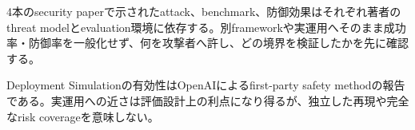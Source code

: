 \begin{claimboundary}
4本のsecurity paperで示されたattack、benchmark、防御効果はそれぞれ著者のthreat modelとevaluation環境に依存する。別frameworkや実運用へそのまま成功率・防御率を一般化せず、何を攻撃者へ許し、どの境界を検証したかを先に確認する。\autocite{src-02da0db00c2d,src-6da0c5a88fa4,src-91b06074799d,src-cd4b60edfee7}
\end{claimboundary}

\begin{claimboundary}
Deployment Simulationの有効性はOpenAIによるfirst-party safety methodの報告である。実運用への近さは評価設計上の利点になり得るが、独立した再現や完全なrisk coverageを意味しない。\autocite{src-c000018ba1f0}
\end{claimboundary}
